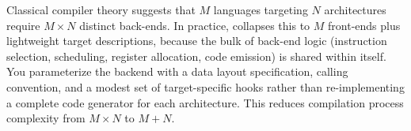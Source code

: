 Classical compiler theory suggests that \(M\) languages targeting \(N\) architectures require \(M \times N\) distinct back-ends. In practice,  collapses this to \(M\) front-ends plus lightweight target descriptions, because the bulk of back-end logic (instruction selection, scheduling, register allocation, code emission) is shared within  itself. You parameterize the backend with a data layout specification, calling convention, and a modest set of target-specific hooks rather than re-implementing a complete code generator for each architecture. This reduces compilation process complexity from \(M \times N\) to \(M + N\).
